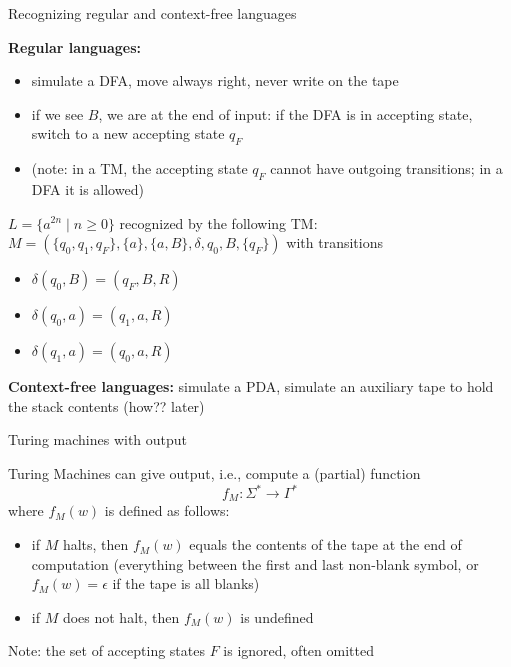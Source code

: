 \documentclass[handout]{beamer}
\begin{document}
\begin{frame}{Recognizing regular and context-free languages}

    \vspace{-8pt}
    \textbf{Regular languages:}
    \vspace{-6pt}
    \begin{itemize}
        \item simulate a DFA, move always right, never write on the tape
        \item if we see $B$, we are at the end of input: if the DFA is in accepting state, switch to a new accepting state $q_F$
        \item (note: in a TM, the accepting state $q_F$ cannot have outgoing transitions; in a DFA it is allowed) 
    \end{itemize}

    \begin{example}
        $L=\{a^{2n}\mid  n\geq 0\}$ recognized by the following TM: $M=(\{q_0,q_1,q_F\},\{a\},\{a,B\},\delta,q_0,B,\{q_F\})$ with transitions 
        \vspace{-6pt}
        \begin{itemize}
            \item $\delta(q_0,B)=(q_F,B,R)$
            \item $\delta(q_0,a)=(q_1,a,R)$
            \item $\delta(q_1,a)=(q_0,a,R)$
        \end{itemize}
    \end{example}
    
    \vspace{-10pt}
    \textbf{Context-free languages:} simulate a PDA, simulate an auxiliary tape to hold the stack contents (how?? later)

\end{frame}


\begin{frame}{Turing machines with output}

    Turing Machines can give output, i.e., compute a (partial) function
    $$
    f_M:\Sigma^*\to\Gamma^*
    $$
    where $f_M(w)$ is defined as follows:
    \begin{itemize}
        \item if $M$ halts, then $f_M(w)$ equals the \alert{contents of the tape} at the end of computation (everything between the first and last non-blank symbol, or $f_M(w)=\epsilon$ if the tape is all blanks) 
        \item if $M$ does not halt, then $f_M(w)$ is \alert{undefined} 
    \end{itemize} 

    Note: the set of accepting states $F$ is ignored, often omitted

\end{frame}
\end{document}

